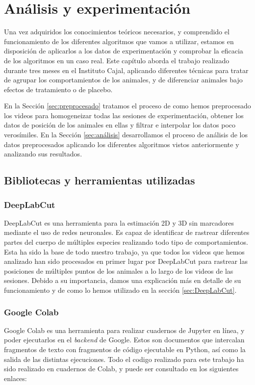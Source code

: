 \chapter{Análisis y experimentación}
\label{chap:analisis-y-experimentacion}

Una vez adquiridos los conocimientos teóricos necesarios, y comprendido el funcionamiento de los diferentes algoritmos que vamos a utilizar, estamos en disposición de aplicarlos a los datos de experimentación y comprobar la eficacia de los algoritmos en un caso real. Este capítulo aborda el trabajo realizado durante tres meses en el Instituto Cajal, aplicando diferentes técnicas para tratar de agrupar los comportamientos de los animales, y de diferenciar animales bajo efectos de tratamiento o de placebo.

En la Sección \ref{sec:preprocesado} tratamos el proceso de como hemos preprocesado los videos para homogeneizar todas las sesiones de experimentación, obtener los datos de posición de los animales en ellas y filtrar e interpolar los datos poco verosímiles. En la Sección \ref{sec:análisis} desarrollamos el proceso de análisis de los datos preprocesados aplicando los diferentes algoritmos vistos anteriormente y analizando sus resultados.

\newpage
\section{Bibliotecas y herramientas utilizadas} \label{sec:herramientas}

\subsection*{DeepLabCut}
DeepLabCut \cite{deeplabcut} es una herramienta para la estimación 2D y 3D sin marcadores mediante el uso de redes neuronales. Es capaz de identificar de rastrear diferentes partes del cuerpo de múltiples especies realizando todo tipo de comportamientos. Esta ha sido la base de todo nuestro trabajo, ya que todos los videos que hemos analizado han sido procesados en primer lugar por DeepLabCut para rastrear las posiciones de múltiples puntos de los animales a lo largo de los videos de las sesiones. Debido a su importancia, damos una explicación más en detalle de su funcionamiento y de como lo hemos utilizado en la sección \ref{sec:DeepLabCut}.

\subsection*{Google Colab}
Google Colab es una herramienta para realizar cuadernos de Jupyter en línea, y poder ejecutarlos en el \textit{backend} de Google. Estos son documentos que intercalan fragmentos de texto con fragmentos de código ejecutable en Python, así como la salida de las distintas ejecuciones. Todo el codigo realizado para este trabajo ha sido realizado en cuadernos de Colab, y puede ser consultado en los siguientes enlaces:

